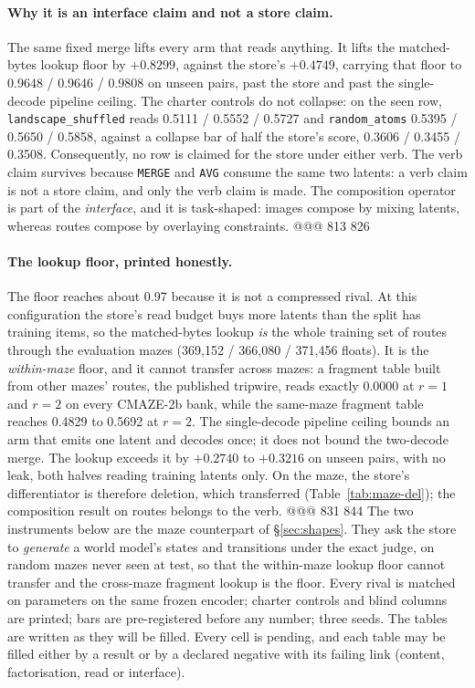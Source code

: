 \paragraph{Why it is an interface claim and not a store claim.} The same fixed merge lifts every
arm that reads anything. It lifts the matched-bytes lookup floor by $+0.8299$, against the
store's $+0.4749$, carrying that floor to 0.9648 / 0.9646 / 0.9808 on unseen pairs, past the
store and past the single-decode pipeline ceiling. %
The charter controls do not collapse: on the seen row, \texttt{landscape\_shuffled} reads 0.5111
/ 0.5552 / 0.5727 and \texttt{random\_atoms} 0.5395 / 0.5650 / 0.5858, against a collapse bar of
half the store's score, 0.3606 / 0.3455 / 0.3508. %
Consequently, no row is claimed for the store under either verb. The verb claim survives because
\texttt{MERGE} and \texttt{AVG} consume the same two latents: a verb claim is not a store claim,
and only the verb claim is made. The composition operator is part of the \emph{interface}, and
it is task-shaped: images compose by mixing latents, whereas routes compose by overlaying
constraints.
@@@ 813 826
\paragraph{The lookup floor, printed honestly.} The floor reaches about 0.97 because it is not a
compressed rival. At this configuration the store's read budget buys more latents than the split
has training items, so the matched-bytes lookup \emph{is} the whole training set of routes
through the evaluation mazes (369,152 / 366,080 / 371,456 floats). %
It is the \emph{within-maze} floor, and it cannot transfer across mazes: a fragment table built
from other mazes' routes, the published tripwire, reads exactly 0.0000 at $r=1$ and $r=2$ on
every CMAZE-2b bank, while the same-maze fragment table reaches 0.4829 to 0.5692 at $r=2$.
The single-decode pipeline ceiling bounds an arm that emits one latent and decodes once; it does
not bound the two-decode merge. The lookup exceeds it by $+0.2740$ to $+0.3216$ on unseen pairs,
with no leak, both halves reading training latents only.
On the maze, the store's differentiator is therefore deletion, which transferred
(Table~\ref{tab:maze-del}); the composition result on routes belongs to the verb.
@@@ 831 844
The two instruments below are the maze counterpart of \S\ref{sec:shapes}. They ask the store to
\emph{generate} a world model's states and transitions under the exact judge, on random mazes
never seen at test, so that the within-maze lookup floor cannot transfer and the cross-maze
fragment lookup is the floor. Every rival is matched on parameters on the same frozen encoder;
charter controls and blind columns are printed; bars are pre-registered before any number; three
seeds. The tables are written as they will be filled. Every cell is pending, and each table may be
filled either by a result or by a declared negative with its failing link (content,
factorisation, read or interface).

